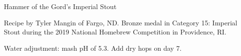 \begin{recipe}{Hammer of the Gord's Imperial Stout}

\begin{aboutblock}
Recipe by Tyler Mangin of Fargo, ND. Bronze medal in Category 15: Imperial
Stout during the 2019 National Homebrew Competition in Providence, RI.
\sourceaha
\end{aboutblock}


\begin{methodandtiming}
 
\begin{mashsteps}
\end{mashsteps}

\begin{fermentationsteps}
\end{fermentationsteps}

\begin{directions}
Water adjustment: mash pH of 5.3. Add dry hops on day 7.
\end{directions}

\end{methodandtiming}

\recipebreak

\begin{ingredientsblock}

\begin{malts}
\end{malts}

\begin{hops}
\end{hops}


\end{ingredientsblock}

\end{recipe}

